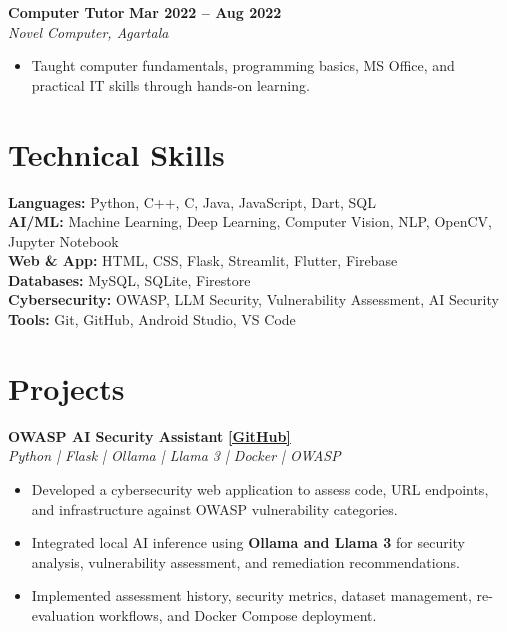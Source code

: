 \documentclass[10pt,a4paper]{article}
\newcommand{\resumeWorkHeading}[3]{
    \textbf{#1}
    \hfill
    \textbf{#3}
    \\
    \textit{#2}
    \vspace{1pt}
}
\newcommand{\resumeProject}[3]{
    \textbf{#1}
    \hfill
    \href{#3}{\textbf{[GitHub]}}
    \\
    \textit{#2}
    \vspace{1pt}
}
\newcommand{\resumeProjectEnd}{
    \vspace{3pt}
}
\newcommand{\skill}[2]{
    \textbf{#1} #2\\
}
\begin{document}

\resumeWorkHeading
{Computer Tutor}
{Novel Computer, Agartala}
{Mar 2022 -- Aug 2022}

\begin{itemize}[leftmargin=14pt, itemsep=1pt, topsep=1pt]
    \item Taught computer fundamentals, programming basics, MS Office,
    and practical IT skills through hands-on learning.
\end{itemize}


\section{Technical Skills}

\skill{Languages:}
{Python, C++, C, Java, JavaScript, Dart, SQL}

\skill{AI/ML:}
{Machine Learning, Deep Learning, Computer Vision, NLP, OpenCV,
Jupyter Notebook}

\skill{Web \& App:}
{HTML, CSS, Flask, Streamlit, Flutter, Firebase}

\skill{Databases:}
{MySQL, SQLite, Firestore}

\skill{Cybersecurity:}
{OWASP, LLM Security, Vulnerability Assessment, AI Security}

\skill{Tools:}
{Git, GitHub, Android Studio, VS Code}


\section{Projects}

\resumeProject
{OWASP AI Security Assistant}
{Python | Flask | Ollama | Llama 3 | Docker | OWASP}
{https://github.com/BijoySarkar19/owasp-ai-security-assistant}

\begin{itemize}[leftmargin=14pt, itemsep=1pt, topsep=1pt]
    \item Developed a cybersecurity web application to assess code, URL endpoints, and infrastructure against OWASP vulnerability categories.
    \item Integrated local AI inference using \textbf{Ollama and Llama 3} for security analysis, vulnerability assessment, and remediation recommendations.
    \item Implemented assessment history, security metrics, dataset management, re-evaluation workflows, and Docker Compose deployment.
\end{itemize}
\resumeProjectEnd
\end{document}
